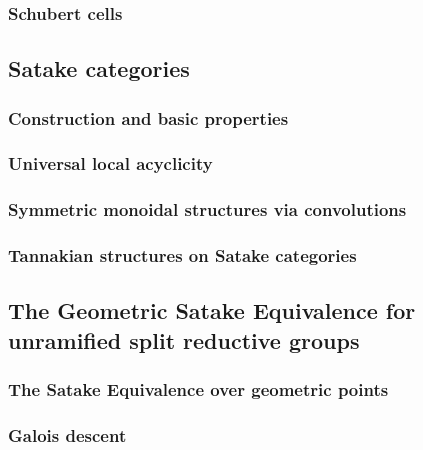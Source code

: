         \subsubsection{Schubert cells}
        
    \subsection{Satake categories}
        \subsubsection{Construction and basic properties}
        
        \subsubsection{Universal local acyclicity}
        
        \subsubsection{Symmetric monoidal structures via convolutions}
        
        \subsubsection{Tannakian structures on Satake categories}
        
    \subsection{The Geometric Satake Equivalence for unramified split reductive groups}
        \subsubsection{The Satake Equivalence over geometric points}
        
        \subsubsection{Galois descent}